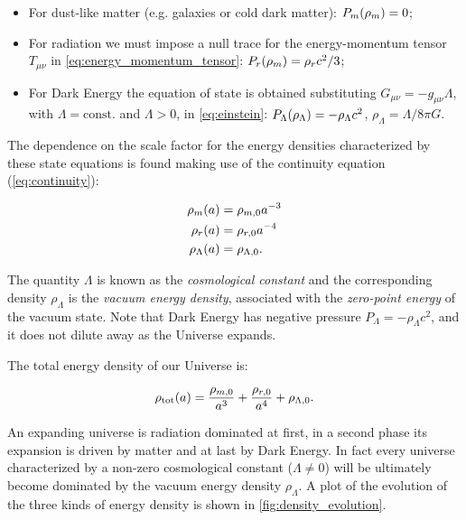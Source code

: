 \begin{itemize}
        \item For dust-like matter (e.g. galaxies or cold dark matter):
        $P_m\qty(\rho_m) = 0$;
        \item For radiation we must impose a null trace for the energy-momentum
        tensor $T_{\mu \nu}$ in \autoref{eq:energy_momentum_tensor}: $P_r\qty(\rho_m)
        = \rho_r c^2/3$;
        \item For Dark Energy the equation of state is obtained
        substituting  $G_{\mu \nu} = -g_{\mu \nu} \Lambda$, with $\Lambda =
        \text{const.}$ and $\Lambda > 0$, in \autoref{eq:einstein}:
        $P_\Lambda\qty(\rho_\Lambda) = -\rho_\Lambda c^2$, $\rho_\Lambda =
        \Lambda/8\pi G$.
\end{itemize}

The dependence on the scale factor for the energy densities characterized by
these state equations is found making use of the continuity equation
(\autoref{eq:continuity}):

\begin{align}
        \rho_m\qty(a) & = \rho_{m,0}a^{-3} \label{eq:rho_m} \\
        \rho_r\qty(a) & = \rho_{r,0}a^{-4} \label{eq:rho_r} \\
        \rho_\Lambda\qty(a) & = \rho_{\Lambda,0} \label{eq:rho_lambda}. \\
\end{align}

The quantity $\Lambda$ is known as the \emph{cosmological constant} and the
corresponding density $\rho_\Lambda$ is the \emph{vacuum energy density},
associated with the \emph{zero-point energy} of the vacuum state. Note that
Dark Energy has negative pressure $P_\Lambda = -\rho_\Lambda c^2$, and it
does not dilute away as the Universe expands.

The total energy density of our Universe is:

\begin{equation}
        \rho_\text{tot}\qty(a) = \frac{\rho_{m,0}}{a^3} + \frac{\rho_{r,0}}{a^4} +
        \rho_{\Lambda,0}.
\end{equation}

An expanding universe is radiation dominated at first, in a second phase
its expansion is driven by matter and at last by Dark Energy. In fact every
universe characterized by a non-zero cosmological constant ($\Lambda \neq
0$) will be ultimately become dominated by the vacuum energy density
$\rho_\Lambda$. A plot of the evolution of the three kinds of energy
density is shown in \autoref{fig:density_evolution}.


